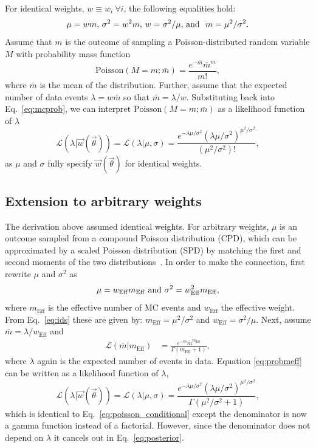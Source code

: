 \documentclass[a4paper, 11pt]{article}
\newcommand{\like}{\mathcal{L}}
\newcommand{\vectheta}{\vec{\theta}}
\newcommand{\vecw}{\vec{w}}
\newcommand{\meff}{m_\mathrm{Eff}}
\newcommand{\weff}{w_\mathrm{Eff}}
\begin{document}
For identical weights, $w \equiv w_i~\forall i$, the following equalities hold:
\begin{equation}\label{eq:ids}
\mu=wm \textmd{,}~ \sigma^2=w^2 m \textmd{,}~ w=\sigma^2/\mu \textmd{, and }~ m = \mu^2/\sigma^2.
\end{equation}
Assume that $m$ is the outcome of sampling a Poisson-distributed random variable $M$ with probability mass function
\begin{equation}\label{eq:mcprob}
\mathrm{Poisson}(M=m;\bar m) = \frac{e^{-\bar m} {\bar m}^m}{m!},
\end{equation}
where $\bar m$ is the mean of the distribution. Further, assume that the expected number of data events $\lambda=w \bar m$ so that $\bar m = \lambda/w$. Substituting back into Eq.~\eqref{eq:mcprob}, we can interpret $\mathrm{Poisson}(M=m;\bar m)$ as a likelihood function of $\lambda$
\begin{equation}
\like(\lambda|\vecw(\vectheta))=\like(\lambda|\mu, \sigma)=\frac{e^{-\lambda\mu/\sigma^2}\left(\lambda\mu/\sigma^2\right)^{\mu^2/\sigma^2}}{(\mu^2/\sigma^2)!},
\label{eq:poisson_conditional}
\end{equation}
as $\mu$ and $\sigma$ fully specify $\vecw(\vectheta)$ for identical weights.

\subsection{Extension to arbitrary weights\label{sec:extending}}
The derivation above assumed identical weights. For arbitrary weights, $\mu$ is an outcome sampled from a compound Poisson distribution (CPD), which can be approximated by a scaled Poisson distribution (SPD) by matching the first and second moments of the two distributions~\cite{Bohm:2013gla}. In order to make the connection, first rewrite $\mu$ and $\sigma^2$ as
\begin{equation}\label{eq:effparameters}
\mu= \weff \meff~\textmd{and}~\sigma^2 = \weff^2 \meff,
\end{equation}
where $\meff$ is the effective number of MC events and $\weff$ the effective weight. From Eq.~\eqref{eq:ids} these are given by: $\meff = \mu^2/\sigma^2$ and $\weff=\sigma^2/\mu$. Next, assume $\bar m = \lambda/\weff$ and
\begin{align}
\label{eq:probmeff}
\like(\bar m|\meff)&= \frac{e^{-\bar m}{\bar m}^{\meff}}{\Gamma(\meff+1)},
\end{align}
where $\lambda$ again is the expected number of events in data. Equation \eqref{eq:probmeff} can be written as a likelihood function of $\lambda$,
\begin{equation}
\like(\lambda|\vecw(\vectheta))=\like(\lambda|\mu, \sigma)=\frac{e^{-\lambda\mu/\sigma^2}\left(\lambda\mu/\sigma^2\right)^{\mu^2/\sigma^2}}{\Gamma(\mu^2/\sigma^2+1)},
\label{eq:poisson_conditional_arb}
\end{equation}
which is identical to Eq.~\eqref{eq:poisson_conditional} except the denominator is now a gamma function instead of a factorial. However, since the denominator does not depend on $\lambda$ it cancels out in Eq.~\eqref{eq:posterior}.
\end{document}
